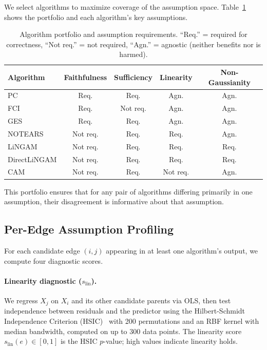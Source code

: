 \documentclass{article}
\begin{document}
We select algorithms to maximize coverage of the assumption space.
Table~\ref{tab:portfolio} shows the portfolio and each algorithm's key assumptions.

\begin{table}[t]
\caption{Algorithm portfolio and assumption requirements. ``Req.'' = required for correctness, ``Not req.'' = not required, ``Agn.'' = agnostic (neither benefits nor is harmed).}
\label{tab:portfolio}
\centering
\small
\begin{tabular}{lcccc}
\toprule
Algorithm & Faithfulness & Sufficiency & Linearity & Non-Gaussianity \\
\midrule
PC & Req. & Req. & Agn. & Agn. \\
FCI & Req. & Not req. & Agn. & Agn. \\
GES & Req. & Req. & Agn. & Agn. \\
NOTEARS & Not req. & Req. & Req. & Agn. \\
LiNGAM & Not req. & Req. & Req. & Req. \\
DirectLiNGAM & Not req. & Req. & Req. & Req. \\
CAM & Not req. & Req. & Not req. & Agn. \\
\bottomrule
\end{tabular}
\end{table}

This portfolio ensures that for any pair of algorithms differing primarily in one assumption, their disagreement is informative about that assumption.

\subsection{Per-Edge Assumption Profiling}

For each candidate edge $(i, j)$ appearing in at least one algorithm's output, we compute four diagnostic scores.

\paragraph{Linearity diagnostic ($s_{\mathrm{lin}}$).}
We regress $X_j$ on $X_i$ and its other candidate parents via OLS, then test independence between residuals and the predictor using the Hilbert-Schmidt Independence Criterion (HSIC)~\citep{gretton2005measuring} with 200 permutations and an RBF kernel with median bandwidth, computed on up to 300 data points.
The linearity score $s_{\mathrm{lin}}(e) \in [0,1]$ is the HSIC $p$-value; high values indicate linearity holds.
\end{document}
